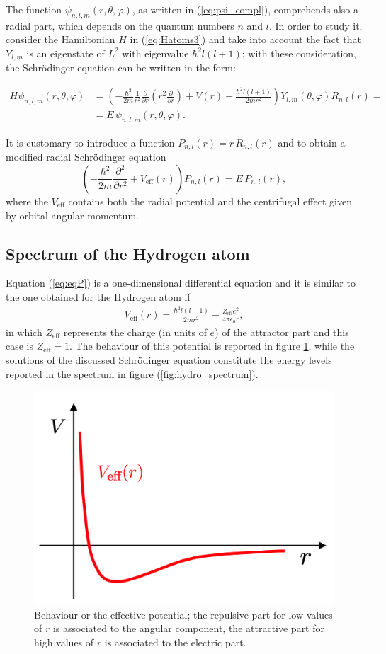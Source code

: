 The function $\psi_{n,l,m}(r,\theta,\varphi)$, as written in (\ref{eq:psi_compl}), comprehends also a radial part, which depends on the quantum numbers $n$ and $l$. In order to study it, consider the Hamiltonian $H$ in (\ref{eq:Hatoms3}) and take into account the fact that $Y_{l,m}$ is an eigenstate of $L^2$ with eigenvalue $\hbar^2 l(l+1)$; with these consideration, the Schr\"odinger equation can be written in the form:

\begin{align*}
    H \psi_{n,l,m}(r,\theta,\varphi) &= \left(-\frac{\hbar^2}{2m}\frac{1}{r^2}\frac{\partial}{\partial r}\left(r^2 \frac{\partial}{\partial r}\right) + V(r)+ \frac{\hbar^2 l(l+1)}{2m r^2}\right)Y_{l,m}(\theta,\varphi) R_{n,l}(r) = \\
    &= E \, \psi_{n,l,m}(r,\theta,\varphi).
\end{align*}

It is customary to introduce a function $P_{n,l}(r) = r \, R_{n,l}(r)$ and to obtain a modified radial Schr\"odinger equation 
\begin{equation}
    \left(-\frac{\hbar^2}{2m} \frac{\partial^2}{\partial r ^2}+ V_\text{eff}(r)\right) P_{n,l}(r)= E \, P_{n,l}(r),
    \label{eq:eqP}
\end{equation}
where the $V_\text{eff}$ contains both the radial potential and the centrifugal effect given by orbital angular momentum.

\subsection{Spectrum of the Hydrogen atom}

Equation (\ref{eq:eqP}) is a one-dimensional differential equation and it is similar to the one obtained for the Hydrogen atom if 
\begin{align}
    V_\text{eff}(r) = \frac{\hbar^2 l(l+1)}{2 m r^2} - \frac{Z_\text{eff} e^2}{4 \pi \epsilon_0 r},
\end{align}
in which $Z_\text{eff}$ represents the charge (in units of $e$) of the attractor part and this case is $Z_\text{eff} = 1$. The behaviour of this potential is reported in figure \ref{fig:eff_potential}, while the solutions of the discussed Schr\"odinger equation constitute the energy levels reported in the spectrum in figure (\ref{fig:hydro_spectrum}).

\begin{figure}[h!]
\centering
    \includegraphics[width=0.45\linewidth]{images/Effective_potential.png}
    \caption{Behaviour or the effective potential; the repulsive part for low values of $r$ is associated to the angular component, the attractive part for high values of $r$ is associated to the electric part.}
    \label{fig:eff_potential}
\end{figure}

